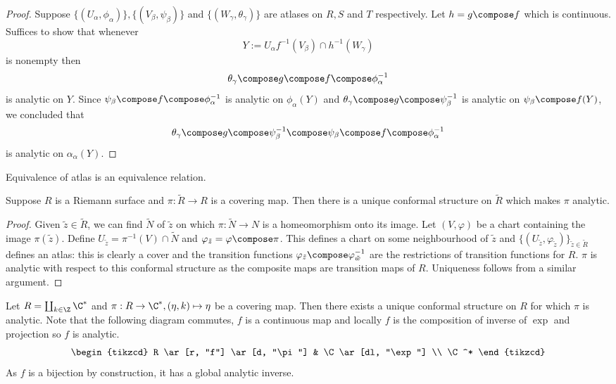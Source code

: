 \documentclass[a4paper]{article}
\begin{document}
\begin{proof}
  Suppose \(\{(U_\alpha, \phi_\alpha)\}, \{(V_\beta, \psi_\beta)\}\) and \(\{(W_\gamma, \theta_\gamma)\}\) are atlases on \(R, S\) and \(T\) respectively. Let \(h = g \compose f\) which is continuous. Suffices to show that whenever
  \[
    Y := U_\alpha f^{-1}(V_\beta) \cap h^{-1} (W_\gamma)
  \]
  is nonempty then
  \[
    \theta_\gamma \compose g \compose f \compose \phi_\alpha^{-1}
  \]
  is analytic on \(Y\). Since \(\psi_\beta \compose f \compose \phi_\alpha^{-1}\) is analytic on \(\phi_\alpha(Y)\) and \(\theta_\gamma \compose g \compose \psi_\beta^{-1}\) is analytic on \(\psi_\beta \compose f (Y)\), we concluded that
  \[
    \theta_\gamma \compose g \compose \psi_\beta^{-1} \compose \psi_\beta \compose f \compose \phi_\alpha^{-1}
  \]
  is analytic on \(\alpha_\alpha(Y)\).
\end{proof}

\begin{corollary}
  Equivalence of atlas is an equivalence relation.
\end{corollary}

\begin{proposition}
  Suppose \(R\) is a Riemann surface and \(\pi: \tilde R \to R\) is a covering map. Then there is a unique conformal structure on \(\tilde R\) which makes \(\pi\) analytic.
\end{proposition}

\begin{proof}
  Given \(\tilde z \in \tilde R\), we can find \(\tilde N\) of \(\tilde z\) on which \(\pi: \tilde N \to N\) is a homeomorphism onto its image. Let \((V, \varphi)\) be a chart containing the image \(\pi(\tilde z)\). Define \(U_{\tilde z} = \pi^{-1}(V) \cap \tilde N\) and \(\varphi_{\tilde z} = \varphi \compose \pi\). This defines a chart on some neighbourhood of \(\tilde z\) and \(\{(U_{\tilde z}, \varphi_{\tilde z})\}_{\tilde z \in \tilde R}\) defines an atlas: this is clearly a cover and the transition functions \(\varphi_{\tilde z} \compose \varphi_{\tilde w}^{-1}\) are the restrictions of transition functions for \(R\). \(\pi\) is analytic with respect to this conformal structure as the composite maps are transition maps of \(R\). Uniqueness follows from a similar argument.
\end{proof}

\begin{eg}
  Let \(R = \coprod_{k \in \Z} \C^*\) and \(\pi: R \to \C^*, (\eta, k) \mapsto \eta\) be a covering map. Then there exists a unique conformal structure on \(R\) for which \(\pi\) is analytic. Note that the following diagram commutes, \(f\) is a continuous map and locally \(f\) is the composition of inverse of \(\exp\) and projection so \(f\) is analytic.
  \[
    \begin{tikzcd}
      R \ar[r, "f"] \ar[d, "\pi"] & \C \ar[dl, "\exp"] \\
      \C^*
    \end{tikzcd}
  \]
  As \(f\) is a bijection by construction, it has a global analytic inverse.
\end{eg}
\end{document}
